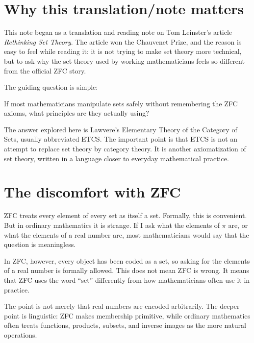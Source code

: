 
\section{Why this translation/note matters}

This note began as a translation and reading note on Tom Leinster's article \emph{Rethinking Set Theory}.  The article won the Chauvenet Prize, and the reason is easy to feel while reading it: it is not trying to make set theory more technical, but to ask why the set theory used by working mathematicians feels so different from the official ZFC story.

The guiding question is simple:
\begin{question}
If most mathematicians manipulate sets safely without remembering the ZFC axioms, what principles are they actually using?
\end{question}

The answer explored here is Lawvere's Elementary Theory of the Category of Sets, usually abbreviated ETCS.  The important point is that ETCS is not an attempt to replace set theory by category theory.  It is another axiomatization of set theory, written in a language closer to everyday mathematical practice.

\section{The discomfort with ZFC}

ZFC treats every element of every set as itself a set.  Formally, this is convenient.  But in ordinary mathematics it is strange.  If I ask what the elements of \(\pi\) are, or what the elements of a real number are, most mathematicians would say that the question is meaningless.

In ZFC, however, every object has been coded as a set, so asking for the elements of a real number is formally allowed.  This does not mean ZFC is wrong.  It means that ZFC uses the word ``set'' differently from how mathematicians often use it in practice.

\begin{remark}
The point is not merely that real numbers are encoded arbitrarily.  The deeper point is linguistic: ZFC makes membership primitive, while ordinary mathematics often treats functions, products, subsets, and inverse images as the more natural operations.
\end{remark}

